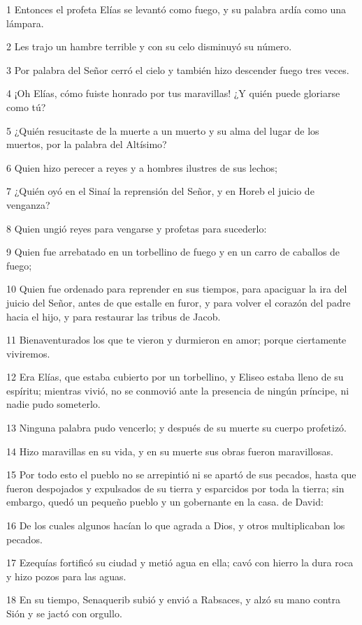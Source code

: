 \par 1 Entonces el profeta Elías se levantó como fuego, y su palabra ardía como una lámpara.
\par 2 Les trajo un hambre terrible y con su celo disminuyó su número.
\par 3 Por palabra del Señor cerró el cielo y también hizo descender fuego tres veces.
\par 4 ¡Oh Elías, cómo fuiste honrado por tus maravillas! ¿Y quién puede gloriarse como tú?
\par 5 ¿Quién resucitaste de la muerte a un muerto y su alma del lugar de los muertos, por la palabra del Altísimo?
\par 6 Quien hizo perecer a reyes y a hombres ilustres de sus lechos;
\par 7 ¿Quién oyó en el Sinaí la reprensión del Señor, y en Horeb el juicio de venganza?
\par 8 Quien ungió reyes para vengarse y profetas para sucederlo:
\par 9 Quien fue arrebatado en un torbellino de fuego y en un carro de caballos de fuego;
\par 10 Quien fue ordenado para reprender en sus tiempos, para apaciguar la ira del juicio del Señor, antes de que estalle en furor, y para volver el corazón del padre hacia el hijo, y para restaurar las tribus de Jacob.
\par 11 Bienaventurados los que te vieron y durmieron en amor; porque ciertamente viviremos.
\par 12 Era Elías, que estaba cubierto por un torbellino, y Eliseo estaba lleno de su espíritu; mientras vivió, no se conmovió ante la presencia de ningún príncipe, ni nadie pudo someterlo.
\par 13 Ninguna palabra pudo vencerlo; y después de su muerte su cuerpo profetizó.
\par 14 Hizo maravillas en su vida, y en su muerte sus obras fueron maravillosas.
\par 15 Por todo esto el pueblo no se arrepintió ni se apartó de sus pecados, hasta que fueron despojados y expulsados ​​de su tierra y esparcidos por toda la tierra; sin embargo, quedó un pequeño pueblo y un gobernante en la casa. de David:
\par 16 De los cuales algunos hacían lo que agrada a Dios, y otros multiplicaban los pecados.
\par 17 Ezequías fortificó su ciudad y metió agua en ella; cavó con hierro la dura roca y hizo pozos para las aguas.
\par 18 En su tiempo, Senaquerib subió y envió a Rabsaces, y alzó su mano contra Sión y se jactó con orgullo.
